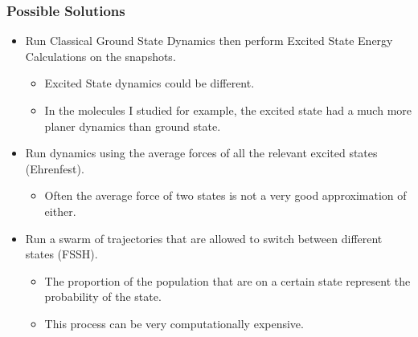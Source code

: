 \documentclass{beamer}
\begin{document}
\begin{frame}
  \frametitle{Possible Solutions}
\begin{itemize}
  \item Run Classical Ground State Dynamics then perform Excited State Energy
    Calculations on the snapshots.
  \begin{itemize}
    \item Excited State dynamics could be different.
    \item In the molecules I studied for example, the excited state had a
      much more planer dynamics than ground state.
  \end{itemize}
  \item Run dynamics using the average forces of all the relevant excited states (Ehrenfest).
  \begin{itemize}
    \item Often the average force of two states is not a very good approximation of either. 
  \end{itemize}
  \item Run a swarm of trajectories that are allowed to switch between different
    states (FSSH).
  \begin{itemize}
    \item The proportion of the population that are on a certain state represent the probability of the state.
    \item This process can be very computationally expensive.
  \end{itemize}
\end{itemize}
\end{frame}
\end{document}
